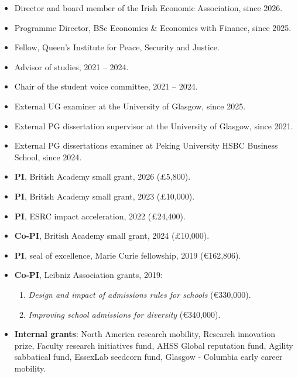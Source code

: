 \documentclass[11pt,a4paper]{article}
\begin{document}
\begin{itemize}[leftmargin=*,noitemsep,partopsep=0pt,topsep=0pt,parsep=0pt]
	\item Director and board member of the Irish Economic Association, since 2026.
	\item Programme Director, BSc Economics \& Economics with Finance, since 2025.
	\item Fellow, Queen's Institute for Peace, Security and Justice.  
	\item Advisor of studies, 2021 -- 2024.
	\item Chair of the student voice committee, 2021 -- 2024.
	\item External UG examiner at the University of Glasgow, since 2025.
	\item External PG dissertation supervisor at the University of Glasgow, since 2021.
	\item External PG dissertations examiner at Peking University HSBC Business School, since 2024.
\end{itemize}
\vspace*{1em}



\begin{itemize}[leftmargin=0pt,noitemsep,partopsep=0pt,topsep=0pt,parsep=0pt]
		\item[] \textbf{PI}, British Academy small grant, 2026 (£5,800).
	\item[] \textbf{PI}, British Academy small grant, 2023 (£10,000).
	\item[] \textbf{PI}, ESRC impact acceleration, 2022 (£24,400).
	\item[] \textbf{Co-PI}, British Academy small grant, 2024 (£10,000).
	\item[] \textbf{PI}, seal of excellence, Marie Curie fellowship, 2019 (€162,806).
	\item[] \textbf{Co-PI}, Leibniz Association grants, 2019:
	\begin{enumerate}
		\item \textit{Design and impact of admissions rules for schools} (€330,000).
		\item \textit{Improving school admissions for diversity} (€340,000).
	\end{enumerate}

	
	\item[] \textbf{Internal grants}: North America research mobility, Research innovation prize, Faculty research initiatives fund, AHSS Global reputation fund, Agility sabbatical fund, EssexLab seedcorn fund, Glasgow - Columbia early career mobility.
\end{itemize}
\end{document}

